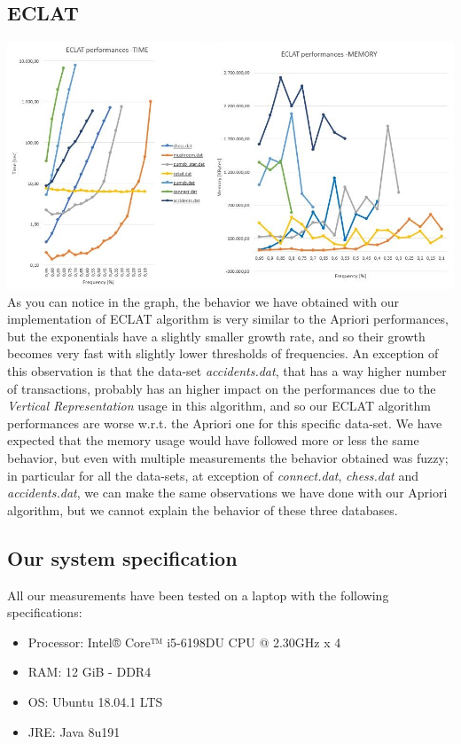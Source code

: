 \documentclass[11pt, a4paper]{article}
\begin{document}
		\subsection{ECLAT}
			\includegraphics[scale =0.6]{ECLAT.JPG}
			\newline
			As you can notice in the graph, the behavior we have obtained with our implementation of ECLAT algorithm is very similar to the Apriori performances, but the exponentials have a slightly smaller growth rate, and so their growth becomes very fast with slightly lower thresholds of frequencies.
			An exception of this observation is that the data-set \textit{accidents.dat}, that has a way higher number of transactions, probably has an higher impact on the performances due to the \textit{Vertical Representation} usage in this algorithm, and so our ECLAT algorithm performances are worse w.r.t. the Apriori one for this specific data-set.
			We have expected that the memory usage would have followed more or less the same behavior, but even with multiple measurements the behavior obtained was fuzzy; in particular for all the data-sets, at exception of \textit{connect.dat}, \textit{chess.dat} and \textit{accidents.dat},  we can make the same observations we have done with our Apriori algorithm, but we cannot explain the behavior of these three databases.
			
			\noindent
		\subsection{Our system specification}
			All our measurements have been tested on a laptop with the following specifications:
			\begin{multicols}{2}
				\begin{itemize}
					\item Processor: Intel® Core™ i5-6198DU CPU @ 2.30GHz x 4 
					\item RAM: 12 GiB - DDR4
					\item OS: Ubuntu 18.04.1 LTS
					\item JRE: Java 8u191
				\end{itemize}
			\end{multicols}
\end{document}
